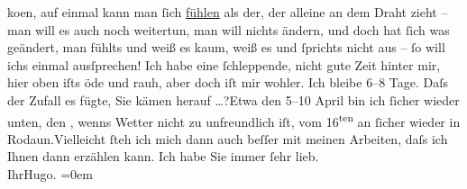 \begin{ledgroupsized}[t]{13cm}
                  ko{\geminationm}en, auf einmal kann man ſich \uline{fühlen} als der, der alleine an dem Draht zieht – man will es
               auch noch weitertun, man will nichts ändern, und doch hat ſich was geändert, man
               fühlts und weiß es kaum, weiß es und ſprichts nicht aus – {\pb}ſo will ichs einmal
               ausſprechen!\pend
           \pstart
           Ich habe eine ſchleppende, nicht gute Zeit hinter mir, hier oben iſts öde und rauh,
               aber doch iſt mir wohler.\pend
           \pstart
           Ich bleibe \label{K_L02167-2v}\label{K_L02167-2h} 6–8 Tage. Daſs
               der Zufall es fügte, Sie kämen herauf {\dots}?\hspace*{1.5em}Etwa den 5–10 April bin ich
               ſicher wieder unten, den \label{K_L02167-3v}\label{K_L02167-3h},
               wenns Wetter nicht zu unfreundlich iſt, vom 16\textsuperscript{ten} an ſicher wieder in Rodaun.\hspace*{1.5em}Vielleicht ſteh ich mich dann auch beſſer  mit meinen Arbeiten, daſs ich Ihnen dann erzählen
               kann.\pend
           \pstart
           Ich habe Sie immer ſehr lieb.{\\[\baselineskip]}Ihr\spacefill\mbox{Hugo.}\pend
           \leftskip=0em{}
         
         \endnumbering{}\end{ledgroupsized}  \newcommand{\dateiname}{L02167}\newcommand{\titel}{Hugo von Hofmannsthal an Arthur Schnitzler, 27. 3. [1914]}\newcommand{\editorInnen}{Martin Anton Müller und Gerd-Hermann Susen}
      
